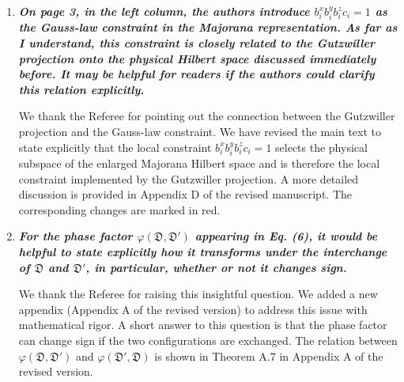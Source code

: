 \documentclass[12pt]{article}
\begin{document}
\begin{enumerate}
    \item \textbf{\textit{On page 3, in the left column, the authors introduce $b_i^x b_i^y b_i^z c_i = 1$ as the Gauss-law constraint in the Majorana representation. As far as I understand, this constraint is closely related to the Gutzwiller projection onto the physical Hilbert space discussed immediately before. It may be helpful for readers if the authors could clarify this relation explicitly.}}


    We thank the Referee for pointing out the connection between the Gutzwiller projection and the Gauss-law constraint. 
    We have revised the main text to state explicitly that the local constraint $b_i^x b_i^y b_i^z c_i = 1$ selects the physical subspace of the enlarged Majorana Hilbert space and is therefore the local constraint implemented by the Gutzwiller projection. 
    A more detailed discussion is provided in Appendix D of the revised manuscript. The corresponding changes are marked in red.

    \item \textbf{\textit{For the phase factor $\varphi(\mathfrak{D},\mathfrak{D}')$ appearing in Eq. (6), it would be helpful to state explicitly how it transforms under the interchange of $\mathfrak{D}$ and $\mathfrak{D}'$, in particular, whether or not it changes sign.}}

    We thank the Referee for raising this insightful question. We added a new appendix (Appendix A of the revised version) to address this issue with mathematical rigor. A short answer to this question is that the phase factor can change sign if the two configurations are exchanged. The relation between $\varphi(\mathfrak{D}, \mathfrak{D}')$ and $\varphi(\mathfrak{D}', \mathfrak{D})$ is shown in Theorem A.7 in Appendix A of the revised version.


\end{enumerate}
\end{document}
